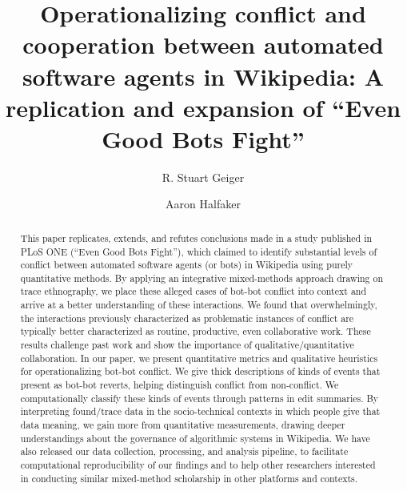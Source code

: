 \documentclass[format=acmsmall, review=false, screen=true]{acmart}%
\begin{document}
\title[Operationalizing Conflict \& Coordination Between Automated Software Agents]{Operationalizing conflict and cooperation between automated software agents in Wikipedia: A replication and expansion of ``Even Good Bots Fight''}

\author{R. Stuart Geiger}
\author{Aaron Halfaker}
\authorsaddresses{}
\begin{abstract}
\noindent This paper replicates, extends, and refutes conclusions made in a study published in PLoS ONE (``Even Good Bots Fight''), which claimed to identify substantial levels of conflict between automated software agents (or bots) in Wikipedia using purely quantitative methods. By applying an integrative mixed-methods approach drawing on trace ethnography, we place these alleged cases of bot-bot conflict into context and arrive at a better understanding of these interactions. We found that overwhelmingly, the interactions previously characterized as problematic instances of conflict are typically better characterized as routine, productive, even collaborative work. These results challenge past work and show the importance of qualitative/quantitative collaboration. In our paper, we present quantitative metrics and qualitative heuristics for operationalizing bot-bot conflict. We give thick descriptions of kinds of events that present as bot-bot reverts, helping distinguish conflict from non-conflict. We computationally classify these kinds of events through patterns in edit summaries. By interpreting found/trace data in the socio-technical contexts in which people give that data meaning, we gain more from quantitative measurements, drawing deeper understandings about the governance of algorithmic systems in Wikipedia. We have also released our data collection, processing, and analysis pipeline, to facilitate computational reproducibility of our findings and to help other researchers interested in conducting similar mixed-method scholarship in other platforms and contexts.

\end{abstract}
\end{document}
